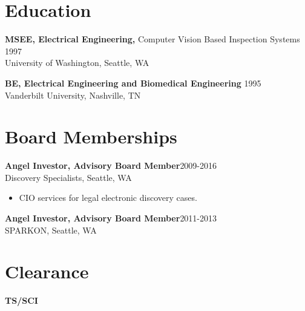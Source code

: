 \begin{resume}
\section{Education} 

{\bf MSEE, Electrical Engineering,} Computer Vision Based Inspection Systems \hfill 1997\\
University of Washington, Seattle, WA

{\bf BE, Electrical Engineering and Biomedical Engineering} \hfill 1995\\
Vanderbilt University, Nashville, TN

%

\section{Board Memberships}
{\bf Angel Investor, Advisory Board Member}\hfill 2009-2016\\
Discovery Specialists, Seattle, WA
\begin{itemize}
\item CIO services for legal electronic discovery cases.
\end{itemize}
{\bf Angel Investor, Advisory Board Member}\hfill 2011-2013\\
SPARKON, Seattle, WA


\section{Clearance} 
{\bf TS/SCI}

\end{resume} 
 



